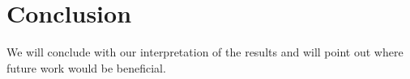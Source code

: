\documentclass[12pt,twoside]{article}
\theoremstyle{plain}
\theoremstyle{definition}
\theoremstyle{remark}
\begin{document}
\section{Conclusion}
\label{sec:concl}

We will conclude with our interpretation of the results and will point out where future work would be beneficial.


%
%
\newpage


\end{document}
